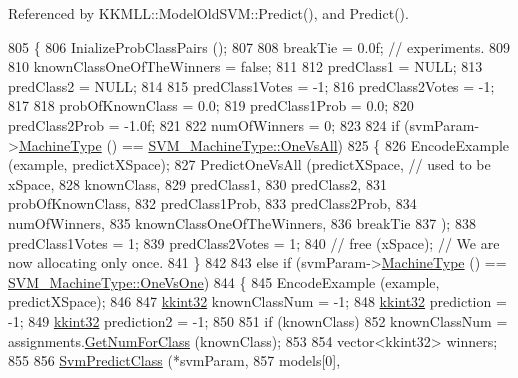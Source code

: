 Referenced by K\+K\+M\+L\+L\+::\+Model\+Old\+S\+V\+M\+::\+Predict(), and Predict().


\begin{DoxyCode}
805 \{
806   InializeProbClassPairs ();
807 
808   breakTie = 0.0f;   \textcolor{comment}{// experiments.}
809 
810   knownClassOneOfTheWinners = \textcolor{keyword}{false};
811 
812   predClass1 = NULL;
813   predClass2 = NULL;
814 
815   predClass1Votes = -1;
816   predClass2Votes = -1;
817 
818   probOfKnownClass = 0.0;
819   predClass1Prob   = 0.0;
820   predClass2Prob   = -1.0f;
821 
822   numOfWinners = 0;
823 
824   \textcolor{keywordflow}{if}  (svmParam->\hyperlink{class_k_k_m_l_l_1_1_s_v_mparam_a30153e00007f9cf65343e0ad97ad61fb}{MachineType} () == \hyperlink{namespace_k_k_m_l_l_ad917464bc631109a3021cf02cd27af9aa0bf7132f9ec5b2de535b831afd3ae75c}{SVM\_MachineType::OneVsAll})
825   \{
826     EncodeExample (example, predictXSpace);
827     PredictOneVsAll (predictXSpace,   \textcolor{comment}{//  used to be xSpace,  }
828                      knownClass,
829                      predClass1,
830                      predClass2,
831                      probOfKnownClass,
832                      predClass1Prob,
833                      predClass2Prob,
834                      numOfWinners,
835                      knownClassOneOfTheWinners,
836                      breakTie
837                     );
838     predClass1Votes = 1;
839     predClass2Votes = 1;
840     \textcolor{comment}{//  free (xSpace);  // We are now allocating only once.}
841   \}
842 
843   \textcolor{keywordflow}{else} \textcolor{keywordflow}{if}  (svmParam->\hyperlink{class_k_k_m_l_l_1_1_s_v_mparam_a30153e00007f9cf65343e0ad97ad61fb}{MachineType} () == \hyperlink{namespace_k_k_m_l_l_ad917464bc631109a3021cf02cd27af9aa2cb1a8e8122853731a8eb99f1bd56630}{SVM\_MachineType::OneVsOne})
844   \{  
845     EncodeExample (example, predictXSpace);
846 
847     \hyperlink{namespace_k_k_b_a8fa4952cc84fda1de4bec1fbdd8d5b1b}{kkint32}  knownClassNum  = -1;
848     \hyperlink{namespace_k_k_b_a8fa4952cc84fda1de4bec1fbdd8d5b1b}{kkint32}  prediction     = -1;
849     \hyperlink{namespace_k_k_b_a8fa4952cc84fda1de4bec1fbdd8d5b1b}{kkint32}  prediction2    = -1;
850 
851     \textcolor{keywordflow}{if}  (knownClass)
852       knownClassNum = assignments.\hyperlink{class_k_k_m_l_l_1_1_class_assignments_a16bde30c19763d38ebcf9c33f0accd5f}{GetNumForClass} (knownClass);
853 
854     vector<kkint32>  winners;
855 
856     \hyperlink{namespace_k_k_m_l_l_a658f1d24f059e14b27229482d01e0400}{SvmPredictClass} (*svmParam,
857                      models[0],

\end{DoxyCode}
